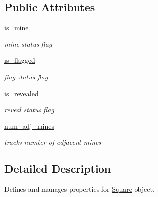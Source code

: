 \subsection*{Public Attributes}
\begin{DoxyCompactItemize}
\item 
\mbox{\label{classsquare_1_1_square_ad2062d3ce87e13025e87dee4e1b85d91}} 
\mbox{\hyperlink{classsquare_1_1_square_ad2062d3ce87e13025e87dee4e1b85d91}{is\+\_\+mine}}
\begin{DoxyCompactList}\small\item\em mine status flag \end{DoxyCompactList}\item 
\mbox{\label{classsquare_1_1_square_a8684629ca55e92a8eab33cab2a109f5e}} 
\mbox{\hyperlink{classsquare_1_1_square_a8684629ca55e92a8eab33cab2a109f5e}{is\+\_\+flagged}}
\begin{DoxyCompactList}\small\item\em flag status flag \end{DoxyCompactList}\item 
\mbox{\label{classsquare_1_1_square_a92711a6d16ffabcb604c324ad639ace8}} 
\mbox{\hyperlink{classsquare_1_1_square_a92711a6d16ffabcb604c324ad639ace8}{is\+\_\+revealed}}
\begin{DoxyCompactList}\small\item\em reveal status flag \end{DoxyCompactList}\item 
\mbox{\label{classsquare_1_1_square_a8fa87301ffc57ce8068f01df1c5c833b}} 
\mbox{\hyperlink{classsquare_1_1_square_a8fa87301ffc57ce8068f01df1c5c833b}{num\+\_\+adj\+\_\+mines}}
\begin{DoxyCompactList}\small\item\em tracks number of adjacent mines \end{DoxyCompactList}\end{DoxyCompactItemize}


\subsection{Detailed Description}
Defines and manages properties for \mbox{\hyperlink{classsquare_1_1_square}{Square}} object. 

